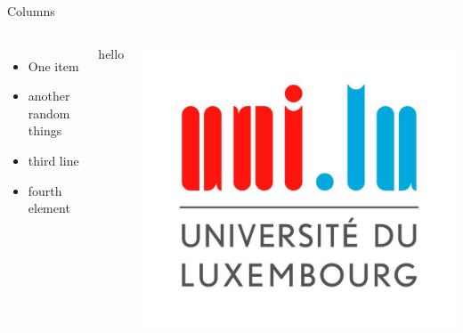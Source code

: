 \documentclass[11pt]{beamer}
\begin{document}
\begin{frame}{Columns}
\begin{columns}
		\begin{itemize}[<+->]
			\item One item
			\item another random things
			\item third line
			\item fourth element
		\end{itemize}
	
		hello
	
		\includegraphics[scale=0.1]{unilu.jpg}
\end{columns}
\end{frame}
\end{document}
